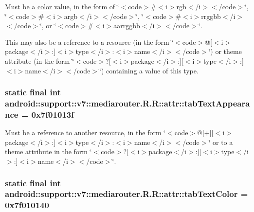 Must be a \hyperlink{classandroid_1_1support_1_1v7_1_1mediarouter_1_1_r_1_1color}{color} value, in the form of \char`\"{}$<$code$>$\#$<$i$>$rgb$<$/i$>$$<$/code$>$\char`\"{}, \char`\"{}$<$code$>$\#$<$i$>$argb$<$/i$>$$<$/code$>$\char`\"{}, \char`\"{}$<$code$>$\#$<$i$>$rrggbb$<$/i$>$$<$/code$>$\char`\"{}, or \char`\"{}$<$code$>$\#$<$i$>$aarrggbb$<$/i$>$$<$/code$>$\char`\"{}. 

This may also be a reference to a resource (in the form \char`\"{}$<$code$>$@\mbox{[}$<$i$>$package$<$/i$>$:\mbox{]}$<$i$>$type$<$/i$>$:$<$i$>$name$<$/i$>$$<$/code$>$\char`\"{}) or theme attribute (in the form \char`\"{}$<$code$>$?\mbox{[}$<$i$>$package$<$/i$>$:\mbox{]}\mbox{[}$<$i$>$type$<$/i$>$:\mbox{]}$<$i$>$name$<$/i$>$$<$/code$>$\char`\"{}) containing a value of this type. \hypertarget{classandroid_1_1support_1_1v7_1_1mediarouter_1_1_r_1_1attr_6e05cc37152581e6002ac8210f0420c4}{
\subsubsection[{tabTextAppearance}]{\setlength{\rightskip}{0pt plus 5cm}static final int android::support::v7::mediarouter.R.R::attr::tabTextAppearance = 0x7f01013f}}
\label{classandroid_1_1support_1_1v7_1_1mediarouter_1_1_r_1_1attr_6e05cc37152581e6002ac8210f0420c4}


Must be a reference to another resource, in the form \char`\"{}$<$code$>$@\mbox{[}+\mbox{]}\mbox{[}$<$i$>$package$<$/i$>$:\mbox{]}$<$i$>$type$<$/i$>$:$<$i$>$name$<$/i$>$$<$/code$>$\char`\"{} or to a theme attribute in the form \char`\"{}$<$code$>$?\mbox{[}$<$i$>$package$<$/i$>$:\mbox{]}\mbox{[}$<$i$>$type$<$/i$>$:\mbox{]}$<$i$>$name$<$/i$>$$<$/code$>$\char`\"{}. \hypertarget{classandroid_1_1support_1_1v7_1_1mediarouter_1_1_r_1_1attr_d1f6ddf8ef37794c67866bb80cbc35ee}{
\subsubsection[{tabTextColor}]{\setlength{\rightskip}{0pt plus 5cm}static final int android::support::v7::mediarouter.R.R::attr::tabTextColor = 0x7f010140}}
\label{classandroid_1_1support_1_1v7_1_1mediarouter_1_1_r_1_1attr_d1f6ddf8ef37794c67866bb80cbc35ee}



